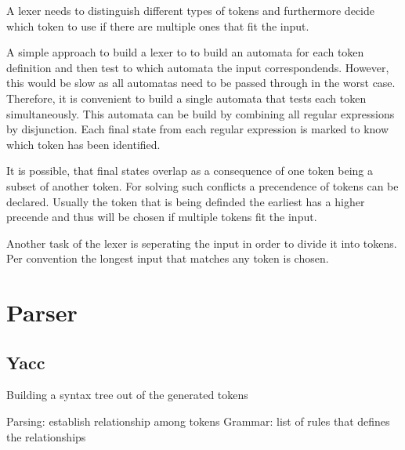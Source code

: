 A lexer needs to distinguish different types of tokens and furthermore decide which token to use if there are multiple ones that fit the input. \cite{Mogensen.2017}

A simple approach to build a lexer to to build an automata for each token definition and then test to which automata the input correspondends.
However, this would be slow as all automatas need to be passed through in the worst case.
Therefore, it is convenient to build a single automata that tests each token simultaneously.
This automata can be build by combining all regular expressions by disjunction.
Each final state from each regular expression is marked to know which token has been identified.

It is possible, that final states overlap as a consequence of one token being a subset of another token.
For solving such conflicts a precendence of tokens can be declared. Usually the token that is being definded the earliest has a higher precende and thus will be chosen if multiple tokens fit the input. \cite{Mogensen.2017}

Another task of the lexer is seperating the input in order to divide it into tokens.
Per convention the longest input that matches any token is chosen. \cite{Mogensen.2017}






\section{Parser}\label{sec:BackgroundParser}
\subsection{Yacc}\label{sec:BackgroundYacc}

Building a syntax tree out of the generated tokens \cite{Mogensen.2017}

Parsing: establish relationship among tokens \cite{LexYacc.1992}
Grammar: list of rules that defines the relationships \cite{LexYacc.1992}

